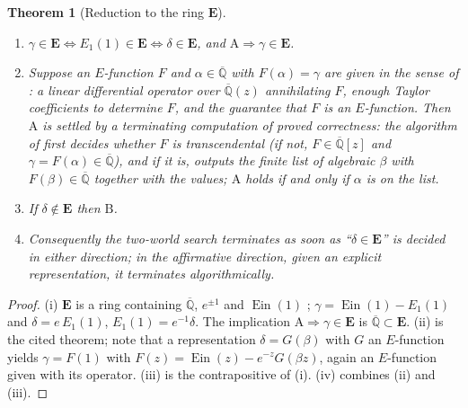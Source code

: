 \documentclass[11pt,a4paper]{article}
\newcommand{\Qbar}{\overline{\mathbb Q}}
\newcommand{\Ein}{\operatorname{Ein}}
\newcommand{\EE}{\mathbf E}
\newtheorem{theorem}{Theorem}[section]
\theoremstyle{definition}
\theoremstyle{remark}
\numberwithin{equation}{section}
\begin{document}
\begin{theorem}[Reduction to the ring $\EE$]\label{I:thm:E-reduction}
\begin{enumerate}[label=(\roman*)]
\item $\gamma\in\EE\iff E_1(1)\in\EE\iff\delta\in\EE$, and $\mathrm A\Rightarrow\gamma\in\EE$.
\item Suppose an $E$-function $F$ and $\alpha\in\Qbar$ with $F(\alpha)=\gamma$ are given in
the sense of \cite[\S2.1]{AR}: a linear differential operator over $\Qbar(z)$ annihilating
$F$, enough Taylor coefficients to determine $F$, and the guarantee that $F$ is an
$E$-function. Then $\mathrm A$ is settled by a terminating computation of proved
correctness: the algorithm of
\cite[Thm.~2]{AR} first decides whether $F$ is transcendental (if not, $F\in\Qbar[z]$ and
$\gamma=F(\alpha)\in\Qbar$), and if it is, outputs the finite list of algebraic $\beta$
with $F(\beta)\in\Qbar$ together with the values; $\mathrm A$ holds if and only if
$\alpha$ is on the list.
\item If $\delta\notin\EE$ then $\mathrm B$.
\item Consequently the two-world search terminates as soon as ``$\delta\in\EE$'' is decided
in either direction; in the affirmative direction, given an explicit representation, it
terminates algorithmically.
\end{enumerate}
\end{theorem}
\begin{proof}
(i) $\EE$ is a ring containing $\Qbar$, $e^{\pm1}$ and $\Ein(1)$ \cite[\S1, after
Def.~2]{FR2016};
$\gamma=\Ein(1)-E_1(1)$ and $\delta=e\,E_1(1)$, $E_1(1)=e^{-1}\delta$. The implication
$\mathrm A\Rightarrow\gamma\in\EE$ is $\Qbar\subset\EE$. (ii) is the cited theorem; note that
a representation $\delta=G(\beta)$ with $G$ an $E$-function yields
$\gamma=F(1)$ with $F(z)=\Ein(z)-e^{-z}G(\beta z)$, again an $E$-function given with its
operator. (iii) is the contrapositive of (i). (iv) combines (ii) and (iii).
\end{proof}
\end{document}
